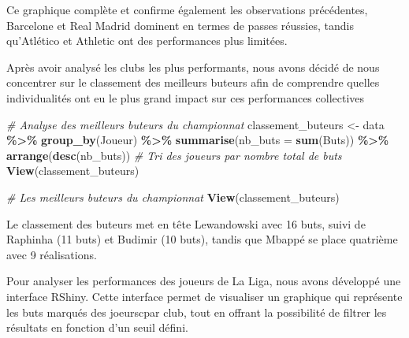 \documentclass[
]{article}
\newenvironment{Shaded}{\begin{snugshade}}{\end{snugshade}}
\newcommand{\AttributeTok}[1]{\textcolor[rgb]{0.13,0.29,0.53}{#1}}
\newcommand{\CommentTok}[1]{\textcolor[rgb]{0.56,0.35,0.01}{\textit{#1}}}
\newcommand{\FunctionTok}[1]{\textcolor[rgb]{0.13,0.29,0.53}{\textbf{#1}}}
\newcommand{\NormalTok}[1]{#1}
\newcommand{\OtherTok}[1]{\textcolor[rgb]{0.56,0.35,0.01}{#1}}
\newcommand{\SpecialCharTok}[1]{\textcolor[rgb]{0.81,0.36,0.00}{\textbf{#1}}}
\begin{document}
Ce graphique complète et confirme également les observations
précédentes, Barcelone et Real Madrid dominent en termes de passes
réussies, tandis qu'Atlético et Athletic ont des performances plus
limitées.

Après avoir analysé les clubs les plus performants, nous avons décidé de
nous concentrer sur le classement des meilleurs buteurs afin de
comprendre quelles individualités ont eu le plus grand impact sur ces
performances collectives

\begin{Shaded}
\begin{Highlighting}[]
\CommentTok{\# Analyse des meilleurs buteurs du championnat}
\NormalTok{classement\_buteurs }\OtherTok{\textless{}{-}}\NormalTok{ data }\SpecialCharTok{\%\textgreater{}\%}
  \FunctionTok{group\_by}\NormalTok{(Joueur) }\SpecialCharTok{\%\textgreater{}\%} 
  \FunctionTok{summarise}\NormalTok{(}\AttributeTok{nb\_buts =} \FunctionTok{sum}\NormalTok{(Buts)) }\SpecialCharTok{\%\textgreater{}\%} 
  \FunctionTok{arrange}\NormalTok{(}\FunctionTok{desc}\NormalTok{(nb\_buts))  }\CommentTok{\# Tri des joueurs par nombre total de buts}
\FunctionTok{View}\NormalTok{(classement\_buteurs)}

\CommentTok{\# Les meilleurs buteurs du championnat}
\FunctionTok{View}\NormalTok{(classement\_buteurs)}
\end{Highlighting}
\end{Shaded}

Le classement des buteurs met en tête Lewandowski avec 16 buts, suivi de
Raphinha (11 buts) et Budimir (10 buts), tandis que Mbappé se place
quatrième avec 9 réalisations.

Pour analyser les performances des joueurs de La Liga, nous avons
développé une interface RShiny. Cette interface permet de visualiser un
graphique qui représente les buts marqués des joeurscpar club, tout en
offrant la possibilité de filtrer les résultats en fonction d'un seuil
défini.
\end{document}
